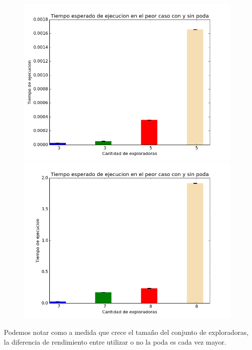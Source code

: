 \documentclass[spanish,a4paper]{article}
\begin{document}
      \begin{figure}[h]
        \includegraphics[scale=0.4]{tiempoE3P}
        \includegraphics[scale=0.4]{tiempoE7P}
      \end{figure}

Podemos notar como a medida que crece el tamaño del conjunto de exploradoras, la diferencia de rendimiento entre utilizar o no la poda 
es cada vez mayor.
\end{document}
